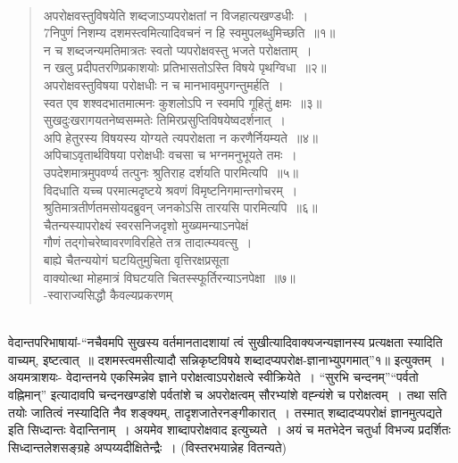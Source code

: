 {~\\[-1.5cm]

\begin{verse}
अपरोक्षवस्तुविषयेति शब्दजाऽप्यपरोक्षतां न विजहात्यखण्डधीः~। \\
7निपुणं निशम्य दशमस्त्वमित्यादिवचनं न हि स्वमुपलब्धुमिच्छति~॥१॥\\
न च शब्दजन्यमतिमात्रतः स्वतो प्यपरोक्षवस्तु भजते परोक्षताम्~। \\
न खलु प्रदीपतरणिप्रकाशयोः प्रतिभासतोऽस्ति विषये पृथग्विधा~॥२॥\\
अपरोक्षवस्तुविषया परोक्षधीः न च मानभावमुपगन्तुमर्हति~। \\
स्वत एव शश्वदभातमात्मनः कुशलोऽपि न स्वमपि गूहितुं क्षमः~॥३॥\\
सुखदुःखरागयतनेष्वसम्मतेः तिमिरप्रसुप्तिविषयेष्वदर्शनात्~। \\
अपि हेतुरस्य विषयस्य योग्यते त्यपरोक्षता न करणैर्नियम्यते~॥४॥\\
अपिचाऽवृतार्थविषया परोक्षधीः वचसा च भग्नमनुभूयते तमः~। \\
उपदेशमात्रमुपवर्ण्य तत्पुनः श्रुतिराह दर्शयति पारमित्यपि~॥५॥\\
विदधाति यच्च परमात्मदृष्टये श्रवणं विमृष्टनिगमान्तगोचरम्~। \\
श्रुतिमात्रतीर्णतमसोयदब्रुवन् जनकोऽसि तारयसि पारमित्यपि~॥६॥\\
चैतन्यस्यापरोक्ष्यं स्वरसनिजदृशो मुख्यमन्याऽनपेक्षं\\ 
गौणं तद्गोचरेष्वावरणविरहिते तत्र तादात्म्यवत्सु~।\\ 
बाह्ये चैतन्ययोगं घटयितुमुचिता वृत्तिरक्षप्रसूता\\
वाक्योत्था मोहमात्रं विघटयति चितस्स्फूर्तिरन्याऽनपेक्षा~॥७॥\\
\hspace{5cm}-स्वाराज्यसिद्धौ कैवल्यप्रकरणम् 
\end{verse}

~\\[-1.7cm]

\noindent
वेदान्तपरिभाषायां-“नचैवमपि सुखस्य वर्तमानतादशायां त्वं सुखीत्यादिवाक्यजन्य\-ज्ञानस्य प्रत्यक्षता स्यादिति वाच्यम्, इष्टत्वात्~॥ दशमस्त्वमसीत्यादौ सन्निकृष्टविषये शब्दादप्यपरोक्ष-ज्ञानाभ्युपगमात्”१॥ इत्युक्तम्~। अयमत्राशयः- वेदान्तनये एकस्मिन्नेव ज्ञाने परोक्षत्वाऽपरोक्षत्वे स्वीक्रियेते~। “सुरभि चन्दनम्”“पर्वतो वह्निमान्” इत्यादावपि चन्दनखण्डांशे पर्वतांशे च अपरोक्षत्वम्  सौरभ्यांशे वह्न्यंशे च परोक्षत्वम्~। तथा सति तयोः जातित्वं नस्यादिति नैव शङ्क्यम्, तादृशजातेरनङ्गीकारात्~। तस्मात् शब्दादप्यपरोक्षं ज्ञानमुत्पद्यते इति सिध्दान्तः वेदान्तिनाम्~। अयमेव शाब्दापरोक्षवाद इत्युच्यते~। अयं च मतभेदेन चतुर्धा विभज्य प्रदर्शितः सिध्दान्तलेशसङ्ग्रहे अप्पय्यदीक्षितेन्द्रैः~। (विस्तरभयान्नेह वितन्यते)

\articleend
}
